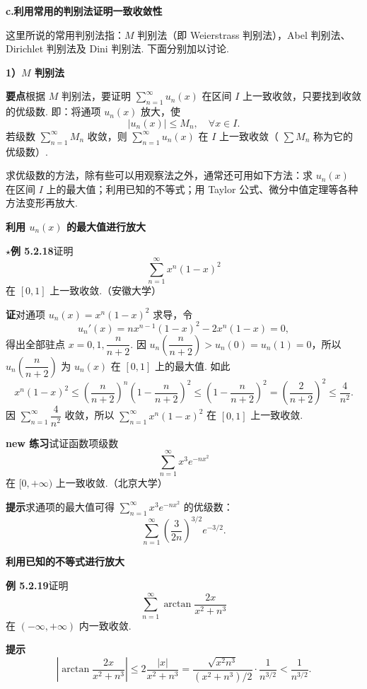 \documentclass[UTF8, 12pt, fontset=fandol, oneside]{ctexart}
\begin{document}
\noindent\textbf{c.\quad 利用常用的判别法证明一致收敛性}

这里所说的常用判别法指：$M$ 判别法（即 Weierstrass 判别法），Abel 判别法、Dirichlet 判别法及 Dini 判别法. 下面分别加以讨论.

\noindent\textbf{1）$M$ 判别法}

\noindent\textbf{要点}\quad 根据 $M$ 判别法，要证明
$\displaystyle\sum_{n=1}^{\infty}u_n(x)$ 在区间 $I$ 上一致收敛，只要找到收敛的优级数. 即：将通项
$u_n(x)$ 放大，使
\[
  |u_n(x)|\le M_n,\quad \forall x\in I.
\]
若级数 $\displaystyle\sum_{n=1}^{\infty}M_n$ 收敛，则
$\displaystyle\sum_{n=1}^{\infty}u_n(x)$ 在 $I$ 上一致收敛（
$\displaystyle\sum M_n$ 称为它的优级数）.

求优级数的方法，除有些可以用观察法之外，通常还可用如下方法：求 $u_n(x)$ 在区间
$I$ 上的最大值；利用已知的不等式；用 Taylor 公式、微分中值定理等各种方法变形再放大.

\noindent\textbf{利用 $u_n(x)$ 的最大值进行放大}

\noindent\textbf{$\star$例 5.2.18}\quad 证明
\[
  \sum_{n=1}^{\infty}x^n(1-x)^2
\]
在 $[0,1]$ 上一致收敛.（安徽大学）

\noindent\textbf{证}\quad 对通项 $u_n(x)=x^n(1-x)^2$ 求导，令
\[
  u_n'(x)=nx^{n-1}(1-x)^2-2x^n(1-x)=0,
\]
得出全部驻点 $x=0,1,\dfrac{n}{n+2}$. 因
$u_n\left(\dfrac{n}{n+2}\right)>u_n(0)=u_n(1)=0$，所以
$u_n\left(\dfrac{n}{n+2}\right)$ 为 $u_n(x)$ 在 $[0,1]$ 上的最大值. 如此
\[
  x^n(1-x)^2
  \le\left(\frac{n}{n+2}\right)^n\left(1-\frac{n}{n+2}\right)^2
  \le\left(1-\frac{n}{n+2}\right)^2
  =\left(\frac2{n+2}\right)^2\le\frac4{n^2}.
\]
因 $\displaystyle\sum_{n=1}^{\infty}\dfrac4{n^2}$ 收敛，所以
$\displaystyle\sum_{n=1}^{\infty}x^n(1-x)^2$ 在 $[0,1]$ 上一致收敛.

\noindent\textbf{new 练习}\quad 试证函数项级数
\[
  \sum_{n=1}^{\infty}x^3e^{-nx^2}
\]
在 $[0,+\infty)$ 上一致收敛.（北京大学）

\noindent\textbf{提示}\quad 求通项的最大值可得
$\displaystyle\sum_{n=1}^{\infty}x^3e^{-nx^2}$ 的优级数：
\[
  \sum_{n=1}^{\infty}\left(\frac3{2n}\right)^{3/2}e^{-3/2}.
\]

\noindent\textbf{利用已知的不等式进行放大}

\noindent\textbf{例 5.2.19}\quad 证明
\[
  \sum_{n=1}^{\infty}\arctan\frac{2x}{x^2+n^3}
\]
在 $(-\infty,+\infty)$ 内一致收敛.

\noindent\textbf{提示}\quad
\[
  \left|\arctan\frac{2x}{x^2+n^3}\right|
  \le2\frac{|x|}{x^2+n^3}
  =\frac{\sqrt{x^2n^3}}{(x^2+n^3)/2}\cdot\frac1{n^{3/2}}<\frac1{n^{3/2}}.
\]
\end{document}
